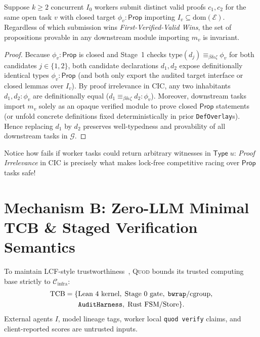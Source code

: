 \documentclass[sigplan,nonacm,10pt]{acmart}
\newcommand{\Cinfra}{\mathcal{C}_{\mathrm{infra}}}
\newcommand{\Truth}{\mathcal{E}}
\newcommand{\Orch}{\mathcal{G}}
\newcommand{\Prop}{\mathsf{Prop}}
\newcommand{\TypeU}{\mathsf{Type}\;u}
\newcommand{\DefEq}{\equiv_{\beta\delta\iota\zeta}}
\newcommand{\code}[1]{\texttt{#1}}
\begin{document}
\begin{theorem}\label{thm:race-irrelevance}
Suppose $k \ge 2$ concurrent $I_0$ workers submit distinct valid proofs $c_1, c_2$ for the same open task $v$ with closed target $\phi_v : \Prop$ importing $I_v \subseteq \mathrm{dom}(\Truth)$. Regardless of which submission wins \emph{First-Verified-Valid Wins}, the set of propositions provable in any downstream module importing $m_v$ is invariant.
\end{theorem}

\begin{proof}
Because $\phi_v : \Prop$ is closed and Stage~1 checks $\mathrm{type}(d_j) \DefEq \phi_v$ for both candidates $j \in \{1, 2\}$, both candidate declarations $d_1, d_2$ expose definitionally identical types $\phi_v : \Prop$ (and both only export the audited target interface or closed lemmas over $I_v$). By proof irrelevance in CIC, any two inhabitants $d_1, d_2 : \phi_v$ are definitionally equal ($d_1 \DefEq d_2 : \phi_v$). Moreover, downstream tasks import $m_v$ solely as an opaque verified module to prove closed $\Prop$ statements (or unfold concrete definitions fixed deterministically in prior \code{DefOverlay}s). Hence replacing $d_1$ by $d_2$ preserves well-typedness and provability of all downstream tasks in $\Orch$.
\end{proof}

Notice how  fails if worker tasks could return arbitrary witnesses in $\TypeU$: \emph{Proof Irrelevance} in CIC is precisely what makes lock-free competitive racing over $\Prop$ tasks safe!

\section{Mechanism B: Zero-LLM Minimal TCB \& Staged Verification Semantics}\label{sec:mech-b}

To maintain LCF-style trustworthiness~\cite{gordon1979edinburgh}, \textsc{Quod} bounds its trusted computing base strictly to $\Cinfra$:
\begin{multline*}
\mathrm{TCB} = \{\text{Lean 4 kernel},\; \text{Stage 0 gate},\; \text{\code{bwrap}/cgroup},\\
  \text{\code{AuditHarness}},\; \text{Rust FSM/Store}\}.
\end{multline*}
External agents $I$, model lineage tags, worker local \code{quod verify} claims, and client-reported scores are untrusted inputs.
\end{document}
